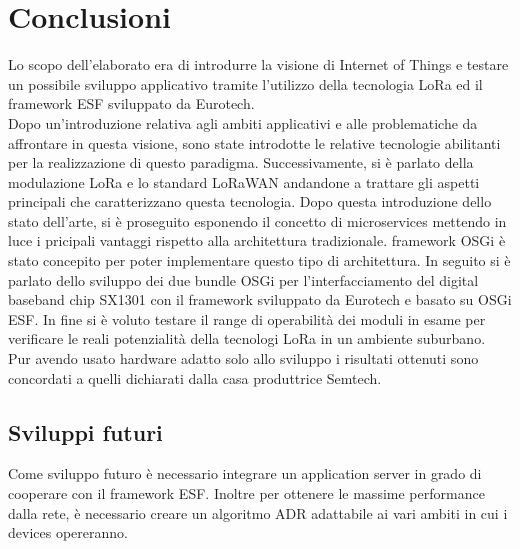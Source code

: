 \chapter{Conclusioni}
Lo scopo dell’elaborato era di introdurre la visione di Internet of Things e
testare un possibile sviluppo applicativo tramite l'utilizzo della tecnologia  
LoRa ed il framework ESF sviluppato da Eurotech.\\
Dopo un'introduzione relativa agli ambiti applicativi e alle problematiche da
affrontare in questa visione, sono state introdotte le relative tecnologie
abilitanti per la realizzazione di  questo paradigma. 
Successivamente, si è parlato della modulazione LoRa e lo standard LoRaWAN
andandone a trattare gli aspetti principali che caratterizzano questa
tecnologia.
Dopo questa introduzione dello stato dell'arte, si è proseguito esponendo il
concetto di microservices mettendo in luce i pricipali vantaggi rispetto alla
architettura tradizionale.
framework OSGi è stato concepito per poter implementare questo tipo di
architettura.
In seguito si è parlato dello sviluppo dei due bundle OSGi per
l'interfacciamento del digital baseband chip SX1301 con il framework sviluppato
da Eurotech e basato su OSGi ESF.
In fine si è voluto testare il range di operabilità dei moduli in esame per
verificare le reali potenzialità della tecnologi LoRa in un ambiente suburbano.
Pur avendo usato hardware adatto solo allo sviluppo   i
risultati ottenuti sono concordati a quelli dichiarati dalla casa produttrice
Semtech.
\section{Sviluppi futuri}
Come sviluppo futuro è necessario integrare un application server in grado di
cooperare con il framework ESF. Inoltre per ottenere le massime performance
dalla rete, è necessario creare un algoritmo ADR adattabile ai vari ambiti in
cui i devices opereranno.
